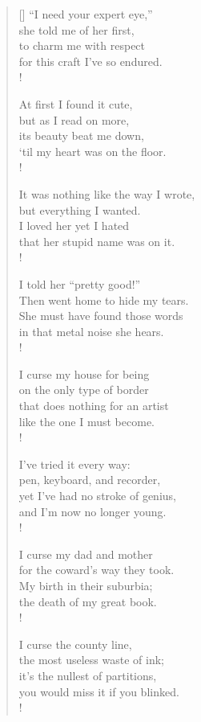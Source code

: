 \documentclass[12pt]{article}
\begin{document}
\begin{multicols}{2}
\begin{verse}[\versewidth]
“I need your expert eye,” \\
she told me of her first, \\
to charm me with respect \\
for this craft I’ve so endured. \\!

At first I found it cute, \\
but as I read on more, \\
its beauty beat me down, \\
‘til my heart was on the floor. \\!

It was nothing like the way I wrote, \\
but everything I wanted. \\
I loved her yet I hated \\
that her stupid name was on it. \\!

I told her “pretty good!” \\
Then went home to hide my tears. \\
She must have found those words \\
in that metal noise she hears. \\!

I curse my house for being \\
on the only type of border \\
that does nothing for an artist \\
like the one I must become. \\!

I’ve tried it every way: \\
pen, keyboard, and recorder, \\
yet I’ve had no stroke of genius, \\
and I’m now no longer young. \\!

I curse my dad and mother \\
for the coward’s way they took. \\
My birth in their suburbia; \\
the death of my great book. \\!

I curse the county line, \\
the most useless waste of ink; \\
it's the nullest of partitions, \\
you would miss it if you blinked. \\!


\end{verse}
\end{multicols}
\end{document}
